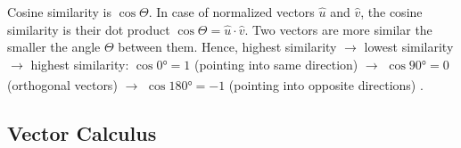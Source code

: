 \begin{tcbitemize}[ skin=sectionraster ]
        \vspace{2ex}

        Cosine similarity is $\cos \Theta$. In case of normalized vectors $\hat{u}$ and $\hat{v}$, the cosine similarity is their dot product $\cos \Theta = \hat{u} \cdot \hat{v}$. Two vectors are more similar
        the smaller the angle $\Theta$ between them. Hence, highest similarity $\rightarrow$ lowest similarity $\rightarrow$ highest similarity: $\cos \ang{0} = 1$ (pointing into same direction) $\rightarrow$ $\cos \ang{90} = 0$ (orthogonal vectors) $\rightarrow$ $\cos \ang{180} = -1$ (pointing into opposite directions) \textsuperscript{\cite[][p.31]{fischerMaschinellesLernenFuer2024}}.

    \end{tcbitemize}

    \subsection{Vector Calculus}
